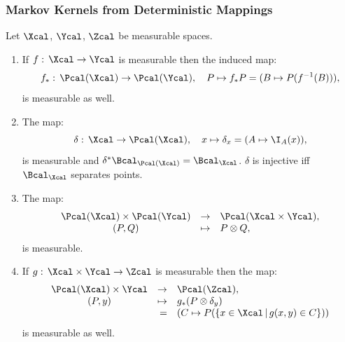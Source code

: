 
\subsubsection{Markov Kernels from Deterministic Mappings}



\begin{Lem}
    \label{lem-maps-markov-kernel}
Let $\Xcal$, $\Ycal$, $\Zcal$ be measurable spaces.
\begin{enumerate}
	\item If $f:\, \Xcal \to \Ycal$ is measurable then the induced map:
        \[f_*:\, \Pcal(\Xcal) \to \Pcal(\Ycal),\quad P \mapsto f_*P = (B \mapsto P(f^{-1}(B))), \]
	 is measurable as well.
	\item The map: 
        \[  \delta:\, \Xcal \to \Pcal(\Xcal),\quad x \mapsto \delta_x =(A \mapsto \I_A(x)), \]
	is measurable and $\delta^*\Bcal_{\Pcal(\Xcal)} = \Bcal_\Xcal$. $\delta$ is injective iff $\Bcal_\Xcal$ separates points.
	\item The map:
	 \[ \begin{array}{ccl} 
	 \Pcal(\Xcal) \times \Pcal(\Ycal) &\to& 
	\Pcal(\Xcal \times \Ycal), \\
	( P, Q ) &\mapsto & P \otimes Q,
\end{array}\]
	is measurable.
	\item If $g:\,\Xcal \times \Ycal  \to \Zcal$ is measurable then the map:
	\[ \begin{array}{crlll}
	   \Pcal(\Xcal) \times \Ycal  &\to& \Pcal(\Zcal), \\
       (P, y) &\mapsto&  g_*(P\otimes \delta_y)\\
                 & =& ( C \mapsto P( \{ x \in \Xcal \,|\, g(x,y) \in C \}) )
		\end{array}
    \]
	is measurable as well.
\end{enumerate}

\end{Lem}

